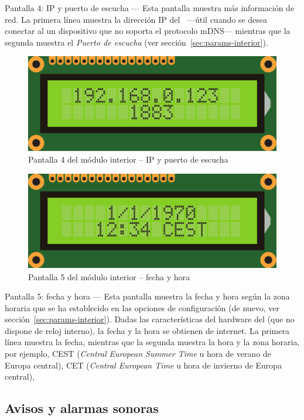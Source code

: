 \begin{descriptioncompact}
\item[Pantalla 4: IP y puerto de escucha] --- Esta pantalla muestra más información de red. La primera línea muestra la dirección IP del \MIE~---útil cuando se desea conectar al \MI un dispositivo que no soporta el protocolo mDNS--- mientras que la segunda muestra el \emph{Puerto de escucha} (ver sección~\ref{sec:params-interior}).

\begin{figure}
  \centering
  \includegraphics[width=0.6\columnwidth]{images/screen4}
  \caption{Pantalla 4 del módulo interior -- IP y puerto de escucha}
  \label{fig:screen4}
\end{figure}

\begin{figure}
  \centering
  \includegraphics[width=0.6\columnwidth]{images/screen5}
  \caption{Pantalla 5 del módulo interior -- fecha y hora}
  \label{fig:screen5}
\end{figure}

\item[Pantalla 5: fecha y hora] --- Esta pantalla muestra la fecha y hora según la zona horaria que se ha establecido en las opciones de configuración (de nuevo, ver sección~\ref{sec:params-interior}). Dadas las características del hardware del \CMS (que no dispone de reloj interno), la fecha y la hora se obtienen de internet. La primera línea muestra la fecha, mientras que la segunda muestra la hora y la zona horaria, por ejemplo, CEST (\textit{Central European Summer Time} u hora de verano de Europa central), CET (\textit{Central European Time} u hora de invierno de Europa central),~\etc

\end{descriptioncompact}


\subsection{Avisos y alarmas sonoras}
\label{sec:alarmas}

